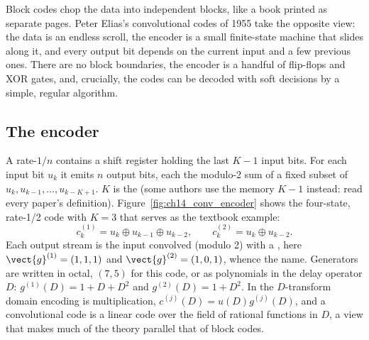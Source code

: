 Block codes chop the data into independent blocks, like a book printed as separate pages. Peter
Elias's convolutional codes of 1955 take the opposite view: the data is an endless scroll, the
encoder is a small finite-state machine that slides along it, and every output bit depends on the
current input and a few previous ones. There are no block boundaries, the encoder is a handful of
flip-flops and XOR gates, and, crucially, the codes can be decoded with soft decisions by a simple,
regular algorithm.

\subsection{The encoder}

A rate-$1/n$  contains a shift register holding the last $K-1$ input
bits. For each input bit $u_k$ it emits $n$ output bits, each the modulo-2 sum of a fixed subset of
$u_k,u_{k-1},\dots,u_{k-K+1}$. $K$ is the  (some authors use the memory
$K-1$ instead: read every paper's definition). Figure~\ref{fig:ch14_conv_encoder} shows the
four-state, rate-1/2 code with $K=3$ that serves as the textbook example:
\begin{equation}
c_k^{(1)}=u_k\oplus u_{k-1}\oplus u_{k-2},\qquad c_k^{(2)}=u_k\oplus u_{k-2}.
\label{eq:ch14:conv75}
\end{equation}
Each output stream is the input convolved (modulo 2) with a , here
$\vect{g}^{(1)}=(1,1,1)$ and $\vect{g}^{(2)}=(1,0,1)$, whence the name. Generators are written in
octal, $(7,5)$ for this code, or as polynomials in the delay operator $D$:
$g^{(1)}(D)=1+D+D^2$ and $g^{(2)}(D)=1+D^2$. In the $D$-transform domain encoding is multiplication,
$c^{(j)}(D)=u(D)g^{(j)}(D)$, and a convolutional code is a linear code over the field of rational
functions in $D$, a view that makes much of the theory parallel that of block codes.

